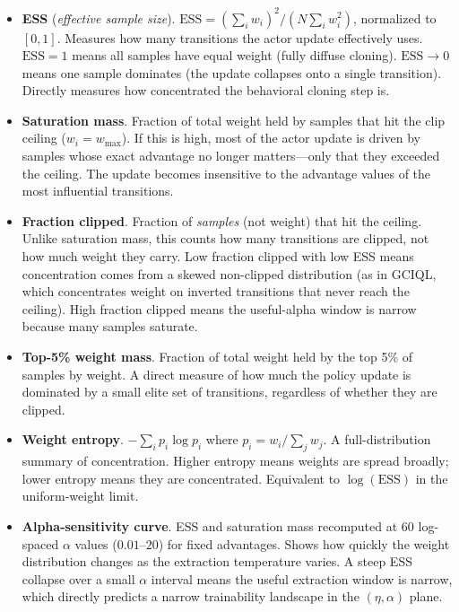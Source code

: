 \documentclass[11pt]{article}
\newcommand{\ESS}{\mathrm{ESS}}
\begin{document}
\begin{itemize}[leftmargin=2em, itemsep=4pt]

  \item \textbf{ESS} (\emph{effective sample size}).
  $\ESS = (\sum_i w_i)^2 / (N \sum_i w_i^2)$, normalized to $[0,1]$.
  Measures how many transitions the actor update effectively uses.
  $\ESS = 1$ means all samples have equal weight (fully diffuse cloning).
  $\ESS \to 0$ means one sample dominates (the update collapses onto a single transition).
  Directly measures how concentrated the behavioral cloning step is.

  \item \textbf{Saturation mass}.
  Fraction of total weight held by samples that hit the clip ceiling ($w_i = w_{\max}$).
  If this is high, most of the actor update is driven by samples whose exact advantage no longer
  matters---only that they exceeded the ceiling. The update becomes insensitive to the advantage
  values of the most influential transitions.

  \item \textbf{Fraction clipped}.
  Fraction of \emph{samples} (not weight) that hit the ceiling.
  Unlike saturation mass, this counts how many transitions are clipped, not how much weight they carry.
  Low fraction clipped with low ESS means concentration comes from a skewed non-clipped distribution
  (as in GCIQL, which concentrates weight on inverted transitions that never reach the ceiling).
  High fraction clipped means the useful-alpha window is narrow because many samples saturate.

  \item \textbf{Top-5\% weight mass}.
  Fraction of total weight held by the top 5\% of samples by weight.
  A direct measure of how much the policy update is dominated by a small elite set of transitions,
  regardless of whether they are clipped.

  \item \textbf{Weight entropy}.
  $-\sum_i p_i \log p_i$ where $p_i = w_i / \sum_j w_j$.
  A full-distribution summary of concentration. Higher entropy means weights are spread broadly;
  lower entropy means they are concentrated. Equivalent to $\log(\ESS)$ in the uniform-weight limit.

  \item \textbf{Alpha-sensitivity curve}.
  ESS and saturation mass recomputed at 60 log-spaced $\alpha$ values ($0.01$--$20$) for fixed advantages.
  Shows how quickly the weight distribution changes as the extraction temperature varies.
  A steep ESS collapse over a small $\alpha$ interval means the useful extraction window is narrow,
  which directly predicts a narrow trainability landscape in the $(\eta, \alpha)$ plane.

\end{itemize}
\end{document}
